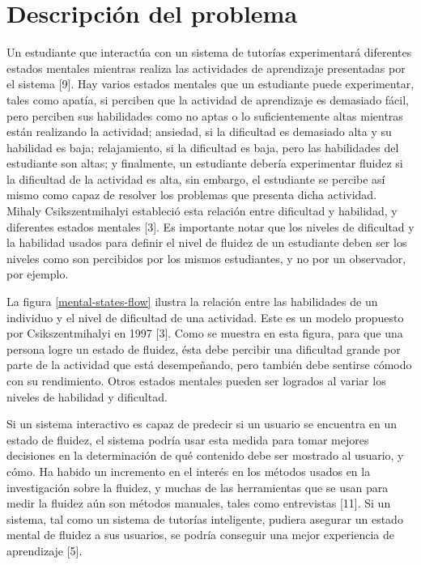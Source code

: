 \section{Descripción del problema}

Un estudiante que interactúa con un sistema de tutorías experimentará diferentes estados mentales mientras realiza las actividades de aprendizaje presentadas por el sistema [9]. Hay varios estados mentales que un estudiante puede experimentar, tales como apatía, si perciben que la actividad de aprendizaje es demasiado fácil, pero perciben sus habilidades como no aptas o lo suficientemente altas mientras están realizando la actividad; ansiedad, si la dificultad es demasiado alta y su habilidad es baja; relajamiento, si la dificultad es baja, pero las habilidades del estudiante son altas; y finalmente, un estudiante debería experimentar fluidez si la dificultad de la actividad es alta, sin embargo, el estudiante se percibe así mismo como capaz de resolver los problemas que presenta dicha actividad. Mihaly Csikszentmihalyi estableció esta relación entre dificultad y habilidad, y diferentes estados mentales [3]. Es importante notar que los niveles de dificultad y la habilidad usados para definir el nivel de fluidez de un estudiante deben ser los niveles como son percibidos por los mismos estudiantes, y no por un observador, por ejemplo.


La figura \ref{mental-states-flow} ilustra la relación entre las habilidades de un individuo y el nivel de dificultad de una actividad. Este es un modelo propuesto por Csikszentmihalyi en 1997 [3]. Como se muestra en esta figura, para que una persona logre un estado de fluidez, ésta debe percibir una dificultad grande por parte de la actividad que está desempeñando, pero también debe sentirse cómodo con su rendimiento. Otros estados mentales pueden ser logrados al variar los niveles de habilidad y dificultad.

Si un sistema interactivo es capaz de predecir si un usuario se encuentra en un estado de fluidez, el sistema podría usar esta medida para tomar mejores decisiones en la determinación de qué contenido debe ser mostrado al usuario, y cómo. Ha habido un incremento en el interés en los métodos usados en la investigación sobre la fluidez, y muchas de las herramientas que se usan para medir la fluidez aún son métodos manuales, tales como entrevistas [11]. Si un sistema, tal como un sistema de tutorías inteligente, pudiera asegurar un estado mental de fluidez a sus usuarios, se podría conseguir una mejor experiencia de aprendizaje [5].


